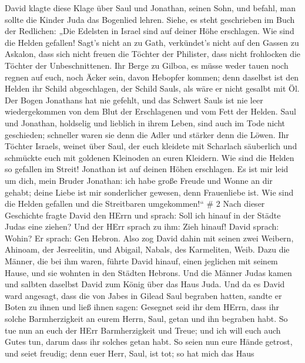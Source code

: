David klagte diese Klage über Saul und Jonathan, seinen Sohn,
 und befahl, man sollte die Kinder Juda das Bogenlied
lehren. Siehe, es steht geschrieben im Buch der Redlichen: 
„Die Edelsten in Israel sind auf deiner Höhe erschlagen. Wie sind die
Helden gefallen!  Sagt's nicht an zu Gath, verkündet's
nicht auf den Gassen zu Askalon, dass sich nicht freuen die Töchter der
Philister, dass nicht frohlocken die Töchter der Unbeschnittenen.
 Ihr Berge zu Gilboa, es müsse weder tauen noch regnen auf
euch, noch Äcker sein, davon Hebopfer kommen; denn daselbst ist den
Helden ihr Schild abgeschlagen, der Schild Sauls, als wäre er nicht
gesalbt mit Öl.  Der Bogen Jonathans hat nie gefehlt, und
das Schwert Sauls ist nie leer wiedergekommen von dem Blut der
Erschlagenen und vom Fett der Helden.  Saul und Jonathan,
holdselig und lieblich in ihrem Leben, sind auch im Tode nicht
geschieden; schneller waren sie denn die Adler und stärker denn die
Löwen.  Ihr Töchter Israels, weinet über Saul, der euch
kleidete mit Scharlach säuberlich und schmückte euch mit goldenen
Kleinoden an euren Kleidern.  Wie sind die Helden so
gefallen im Streit! Jonathan ist auf deinen Höhen erschlagen.
 Es ist mir leid um dich, mein Bruder Jonathan: ich habe
große Freude und Wonne an dir gehabt; deine Liebe ist mir sonderlicher
gewesen, denn Frauenliebe ist.  Wie sind die Helden
gefallen und die Streitbaren umgekommen!{}`` \# 2  Nach
dieser Geschichte fragte David den HErrn und sprach: Soll ich hinauf in
der Städte Judas eine ziehen? Und der HErr sprach zu ihm: Zieh hinauf!
David sprach: Wohin? Er sprach: Gen Hebron.  Also zog David
dahin mit seinen zwei Weibern, Ahinoam, der Jesreelitin, und Abigail,
Nabals, des Karmeliten, Weib.  Dazu die Männer, die bei ihm
waren, führte David hinauf, einen jeglichen mit seinem Hause, und sie
wohnten in den Städten Hebrons.  Und die Männer Judas kamen
und salbten daselbst David zum König über das Haus Juda. Und da es David
ward angesagt, dass die von Jabes in Gilead Saul begraben hatten,
 sandte er Boten zu ihnen und ließ ihnen sagen: Gesegnet
seid ihr dem HErrn, dass ihr solche Barmherzigkeit an eurem Herrn, Saul,
getan und ihn begraben habt.  So tue nun an euch der HErr
Barmherzigkeit und Treue; und ich will euch auch Gutes tun, darum dass
ihr solches getan habt.  So seien nun eure Hände getrost,
und seiet freudig; denn euer Herr, Saul, ist tot; so hat mich das Haus
